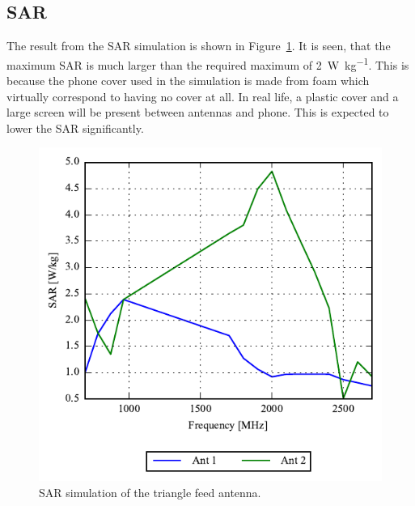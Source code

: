 \FloatBarrier
\subsection{SAR}
The result from the SAR simulation is shown in Figure~\ref{fig:triang_sar_sim}. It is seen, that the maximum SAR is much larger than the required maximum of \SI{2}{W\per kg}. This is because the phone cover used in the simulation is made from foam which virtually correspond to having no cover at all. In real life, a plastic cover and a large screen will be present between antennas and phone. This is expected to lower the SAR significantly.

\begin{figure}[htbp]
    \centering
    \includegraphics{img/tech_sol/trianglefeed/sar/sar.pdf}
    \caption{SAR simulation of the triangle feed antenna.}
    \label{fig:triang_sar_sim}
\end{figure}


